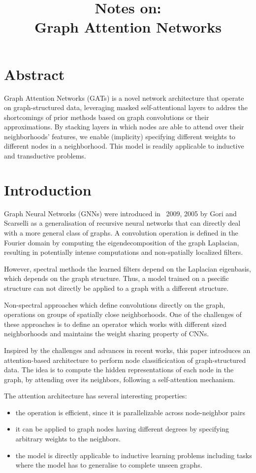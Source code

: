 \documentclass{article}
\title{\textbf{Notes on:}\\ Graph Attention Networks}
\author{}
\begin{document}
\maketitle{}

\section{Abstract}
Graph Attention Networks (GATs) is a novel network architecture that operate on
graph-structured data, leveraging masked self-attentional layers to addres the
shortcomings of prior methods based on graph convolutions or their
approximations. By stacking layers in which nodes are able to attend over their
neighborhoods' features, we enable (implicity) specifying different weights to
different nodes in a neighborhood. This model is readily applicable to
inductive and transductive problems.

\section{Introduction}
Graph Neural Networks (GNNs) were introduced in ~2009, 2005 by Gori and
Scarselli as a generalisation of recursive neural networks that can directly
deal with a more general class of graphs. A convolution operation is defined in
the Fourier domain by computing the eigendecomposition of the graph Laplacian,
resulting in potentially intense computations and non-spatially localized
filters.

However, spectral methods the learned filters depend on  the Laplacian
eigenbasis, which depends on the graph structure. Thus, a model trained on a
psecific structure can not directly be applied to a graph with a different
structure.

Non-spectral approaches which define convolutions directly on the graph,
operations on groups of spatially close neighborhoods. One of the challenges of
these approaches is to define an operator which works with different sized
neighborhoods and maintains the weight sharing property of CNNs.

Inspired by the challenges and advances in recent works, this paper introduces
an attention-based architecture to perform node classificication of
graph-structured data. The idea is to compute the hidden representations of
each node in the graph, by attending over its neighbors, following a
self-attention mechanism.

The attention architecture has several interesting properties:
\begin{itemize}
  \item the operation is efficient, since it is parallelizable across node-neighbor pairs
  \item it can be applied to graph nodes having different degrees by specifying arbitrary weights
    to the neighbors.
  \item the model is directly applicable to inductive learning problems including tasks where the model
    has to generalise to complete unseen graphs.
\end{itemize}
\end{document}
